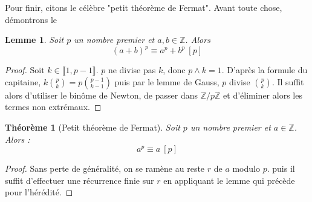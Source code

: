 \documentclass[french]{book}
\newcommand{\Z}{\mathbb{Z}}
\theoremstyle{plain}
\newtheorem{thm}{Théorème}[chapter]
\newtheorem{lem}{Lemme}[chapter]
\theoremstyle{definition}
\theoremstyle{remark}
\begin{document}
Pour finir, citons le célèbre "petit théorème de Fermat". Avant toute chose, démontrons le
\begin{lem}
	Soit $p$ un nombre premier et $a,b\in\Z$. Alors $$(a+b)^p\equiv a^p+b^p\ [p]$$
\end{lem}
\begin{proof}
	Soit $k\in\llbracket1,p-1\rrbracket$. $p$ ne divise pas $k$, donc $p\wedge k=1$. D'après la formule du capitaine, $\displaystyle k\binom{p}{k}=p\binom{p-1}{k-1}$ puis par le lemme de Gauss, $p$ divise $\displaystyle\binom{p}{k}$. Il suffit alors d'utiliser le binôme de Newton, de passer dans $\Z/p\Z$ et d'éliminer alors les termes non extrémaux.
\end{proof}
\begin{thm}[Petit théorème de Fermat]
	Soit $p$ un nombre premier et $a\in\Z$. Alors : $$a^p\equiv a\ [p]$$
\end{thm}
\begin{proof}
	Sans perte de généralité, on se ramène au reste $r$ de $a$ modulo $p$. puis il suffit d'effectuer une récurrence finie sur $r$ en appliquant le lemme qui précède pour l'hérédité.
\end{proof}
\end{document}
